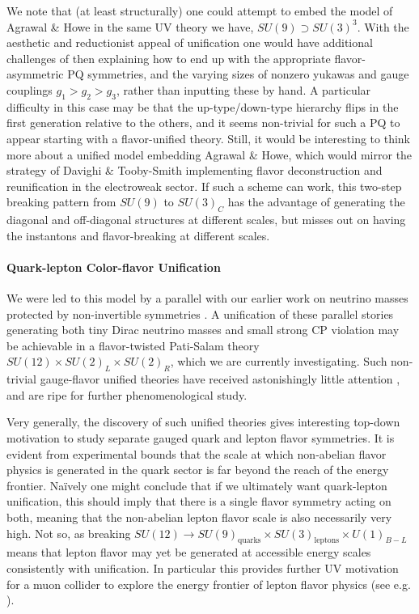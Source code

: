 \documentclass[11pt,a4paper]{article}
\begin{document}
We note that (at least structurally) one could attempt to embed the model of Agrawal \& Howe in the same UV theory we have, $SU(9) \supset SU(3)^3$. 
With the aesthetic and reductionist appeal of unification one would have additional challenges of then explaining how to end up with the appropriate flavor-asymmetric PQ symmetries, and the varying sizes of nonzero yukawas and gauge couplings $g_1 > g_2 > g_3$, rather than inputting these by hand. 
A particular difficulty in this case may be that the up-type/down-type hierarchy flips in the first generation relative to the others, and it seems non-trivial for such a PQ to appear starting with a flavor-unified theory.  
Still, it would be interesting to think more about a unified model embedding Agrawal \& Howe, which would mirror the strategy of Davighi \& Tooby-Smith \cite{Davighi:2022fer} implementing flavor deconstruction and reunification in the electroweak sector.
If such a scheme can work, this two-step breaking pattern from $SU(9)$ to $SU(3)_C$ has the advantage of generating the diagonal and off-diagonal structures at different scales, but misses out on having the instantons and flavor-breaking at different scales.  

\paragraph{Quark-lepton Color-flavor Unification}

We were led to this model by a parallel with our earlier work on neutrino masses protected by non-invertible symmetries \cite{Cordova:2022fhg}. 
A unification of these parallel stories generating both tiny Dirac neutrino masses and small strong CP violation may be achievable in a flavor-twisted Pati-Salam theory $SU(12)\times SU(2)_L \times SU(2)_R$, which we are currently investigating. 
Such non-trivial gauge-flavor unified theories have received astonishingly little attention \cite{Kuo:1984md,Davighi:2022fer,Davighi:2022qgb}, and are ripe for further phenomenological study.

Very generally, the discovery of such unified theories gives interesting top-down motivation to study separate gauged quark and lepton flavor symmetries. 
It is evident from experimental bounds that the scale at which non-abelian flavor physics is generated in the quark sector is far beyond the reach of the energy frontier. 
Na\"{i}vely one might conclude that if we ultimately want quark-lepton unification, this should imply that there is a single flavor symmetry acting on both, meaning that the non-abelian lepton flavor scale is also necessarily very high.
Not so, as breaking $SU(12) \rightarrow SU(9)_{\text{quarks}} \times SU(3)_{\text{leptons}} \times U(1)_{B-L}$ means that lepton flavor may yet be generated at accessible energy scales consistently with unification.
In particular this provides further UV motivation for a muon collider to explore the energy frontier of lepton flavor physics (see e.g. \cite{Dasgupta:2023zrh}).
\end{document}
